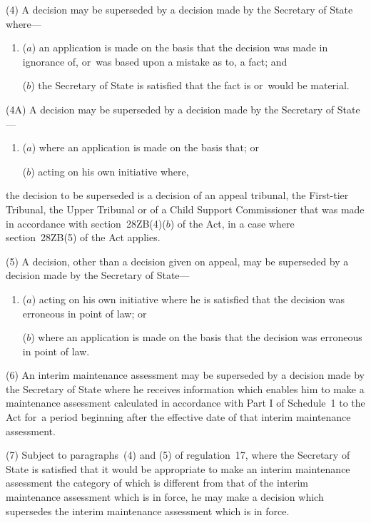 \documentclass[a4paper,12pt]{article}
\begin{document}
(4) A decision may be superseded by a decision made by the Secretary of State where---
\begin{enumerate}\item[]
($a$) an application is made on the basis that the decision was made in ignorance of, or~was based upon a mistake as to, a fact; and

($b$) the Secretary of State is satisfied that the fact is or~would be material.
\end{enumerate}

(4A) A decision may be superseded by a decision made by the Secretary of State—
\begin{enumerate}\item[]
($a$) where an application is made on the basis that; or

($b$) acting on his own initiative where,
\end{enumerate}
the decision to be superseded is a decision of 
an appeal tribunal, the First-tier Tribunal, the Upper Tribunal or of a Child Support Commissioner  %
that was made in accordance with section~28ZB(4)($b$)  of the Act, in a case where section~28ZB(5) of the Act applies.

(5) A decision, other than a decision given on appeal, may be superseded by a decision made by the Secretary of State---
\begin{enumerate}\item[]
($a$) acting on his own initiative where he is satisfied that the decision was erroneous in point of law; or

($b$) where an application is made on the basis that the decision was erroneous in point of law.
\end{enumerate}

(6) An interim maintenance assessment may be superseded by a decision made by the Secretary of State where he receives information which enables him to make a maintenance assessment calculated in accordance with Part I of Schedule~1 to the Act for~a period beginning after the effective date of that interim maintenance assessment.

(7) Subject to paragraphs~(4) and (5) of regulation~17, where the Secretary of State is satisfied that it would be appropriate to make an interim maintenance assessment the category of which is different from that of the interim maintenance assessment which is in force, he may make a decision which supersedes the interim maintenance assessment which is in force.
\end{document}
